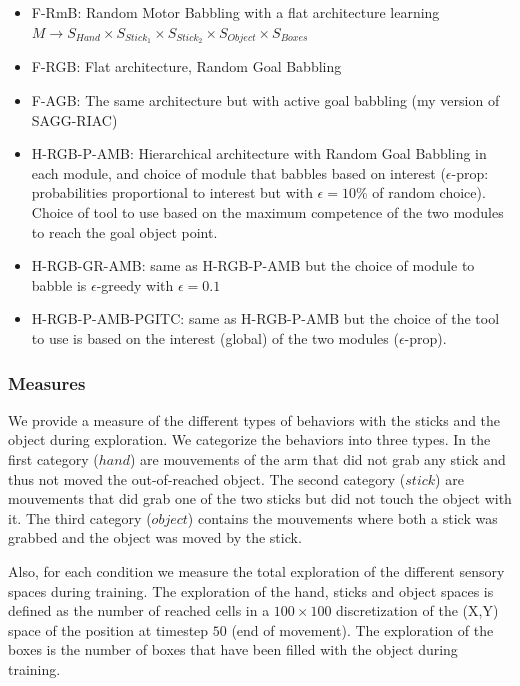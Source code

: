 \documentclass[10pt,letterpaper]{article}
\begin{document}
			\begin{itemize}
			
				\item F-RmB: Random Motor Babbling with a flat architecture learning $M \rightarrow S_{Hand} \times S_{Stick_1} \times S_{Stick_2} \times S_{Object} \times S_{Boxes}$
				\item F-RGB: Flat architecture, Random Goal Babbling
				\item F-AGB: The same architecture but with active goal babbling (my version of SAGG-RIAC)
				\item H-RGB-P-AMB: Hierarchical architecture with Random Goal Babbling in each module, and choice of module that babbles based on interest ($\epsilon$-prop: probabilities proportional to interest but with $\epsilon=10\%$ of random choice). Choice of tool to use based on the maximum competence of the two modules to reach the goal object point.
				\item H-RGB-GR-AMB: same as H-RGB-P-AMB but the choice of module to babble is $\epsilon$-greedy with $\epsilon=0.1$
				\item H-RGB-P-AMB-PGITC: same as H-RGB-P-AMB but the choice of the tool to use is based on the interest (global) of the two modules ($\epsilon$-prop).

			\end{itemize}
				
		
		\subsubsection{Measures}
			
			We provide a measure of the different types of behaviors with the sticks and the object during exploration. 
			We categorize the behaviors into three types.
			In the first category ($hand$) are mouvements of the arm that did not grab any stick and thus not moved the out-of-reached object.
			The second category ($stick$) are mouvements that did grab one of the two sticks but did not touch the object with it.
			The third category ($object$) contains the mouvements where both a stick was grabbed and the object was moved by the stick.
			
			Also, for each condition we measure the total exploration of the different sensory spaces during training. 
			The exploration of the hand, sticks and object spaces is defined as the number of reached cells 
			in a $100\times100$ discretization of the (X,Y) space of the position at timestep $50$ (end of movement).
			The exploration of the boxes is the number of boxes that have been filled with the object during training.
			
\end{document}

